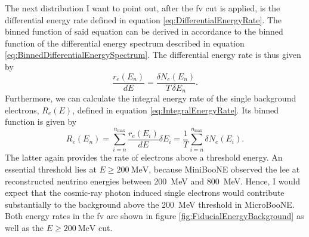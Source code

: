 The next distribution I want to point out, after the \gls{fv} cut is applied, is the differential energy rate defined in equation \ref{eq:DifferentialEnergyRate}. The binned function of said equation can be derived in accordance to the binned function of the differential energy spectrum described in equation \ref{eq:BinnedDifferentialEnergySpectrum}. The differential energy rate is thus given by
\begin{equation} \label{eq:BinnedDifferentialEnergyRate}
    \frac{r_e(E_n)}{dE} = \frac{\delta N_e(E_n)}{T\, \delta E_n}.
\end{equation}
Furthermore, we can calculate the integral energy rate of the single background electrons, $R_e(E)$, defined in equation \ref{eq:IntegralEnergyRate}. Its binned function is given by
\begin{equation} \label{eq:BinnedIntegralEnergyRate}
    R_e(E_n) = \sum_{i=n}^{n_\text{max}} \frac{r_e(E_i)}{dE} \delta E_i = \frac{1}{T} \sum_{i=n}^{n_\text{max}} \delta N_e(E_i).
\end{equation}
The latter again provides the rate of electrons above a threshold energy. An essential threshold lies at $E \geq \SI{200}{\mega\electronvolt}$, because MiniBooNE observed the \gls{lee} at reconstructed neutrino energies between \SI{200}{\mega\electronvolt} and \SI{800}{\mega\electronvolt}. Hence, I would expect that the cosmic-ray photon induced single electrons would contribute substantially to the background above the \SI{200}{\mega\electronvolt} threshold in MicroBooNE. Both energy rates in the \gls{fv} are shown in figure \ref{fig:FiducialEnergyBackground} as well as the $E \geq \SI{200}{\mega\electronvolt}$ cut. 
